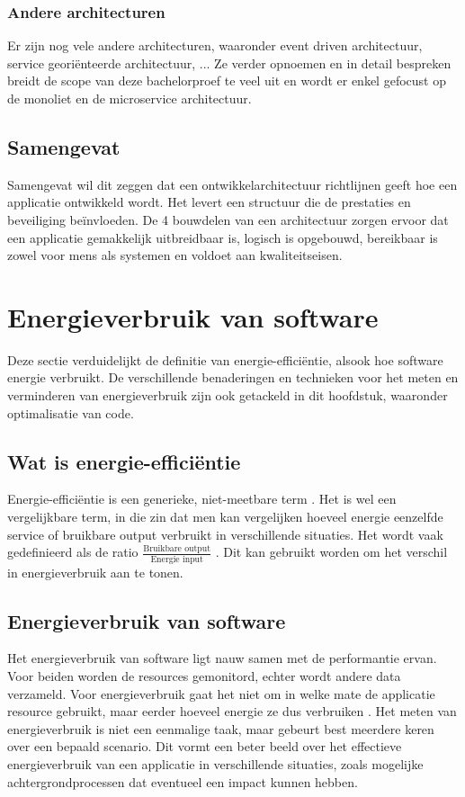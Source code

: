 \subsubsection{Andere architecturen}
Er zijn nog vele andere architecturen, waaronder event driven architectuur, service georiënteerde architectuur, ... Ze verder opnoemen en in detail bespreken breidt de scope van deze bachelorproef te veel uit en wordt er enkel gefocust op de monoliet en de microservice architectuur. 

\subsection{Samengevat}
Samengevat wil dit zeggen dat een ontwikkelarchitectuur richtlijnen geeft hoe een applicatie ontwikkeld wordt. Het levert een structuur die de prestaties en beveiliging beïnvloeden. De 4 bouwdelen van een architectuur zorgen ervoor dat een applicatie gemakkelijk uitbreidbaar is, logisch is opgebouwd, bereikbaar is zowel voor mens als systemen en voldoet aan kwaliteitseisen.



\section{Energieverbruik van software}
Deze sectie verduidelijkt de definitie van energie-efficiëntie, alsook hoe software energie verbruikt. De verschillende benaderingen en technieken voor het meten en verminderen van energieverbruik zijn ook getackeld in dit hoofdstuk, waaronder optimalisatie van code.

\subsection{Wat is energie-efficiëntie}
Energie-efficiëntie is een generieke, niet-meetbare term \autocite{Patterson1996}. Het is wel een vergelijkbare term, in die zin dat men kan vergelijken hoeveel energie eenzelfde service of bruikbare output verbruikt in verschillende situaties. Het wordt vaak gedefinieerd als de ratio 
$\frac{\text{Bruikbare output}}{\text{Energie input}}$ . Dit kan gebruikt worden om het verschil in energieverbruik aan te tonen.

\subsection{Energieverbruik van software}
Het energieverbruik van software ligt nauw samen met de performantie ervan. Voor beiden worden de resources gemonitord, echter wordt andere data verzameld. Voor energieverbruik gaat het niet om in welke mate de applicatie resource gebruikt, maar eerder hoeveel energie ze dus verbruiken \autocite{Kor2015}. Het meten van energieverbruik is niet een eenmalige taak, maar gebeurt best meerdere keren over een bepaald scenario. Dit vormt een beter beeld over het effectieve energieverbruik van een applicatie in verschillende situaties, zoals mogelijke achtergrondprocessen dat eventueel een impact kunnen hebben.

